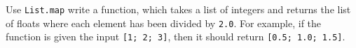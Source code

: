 Use \lstinline{List.map} write a function, which takes a list of integers and returns the list of floats where each element has been divided by \lstinline{2.0}. For example, if the function is given the input \lstinline{[1; 2; 3]}, then it should return \lstinline{[0.5; 1.0; 1.5]}.

